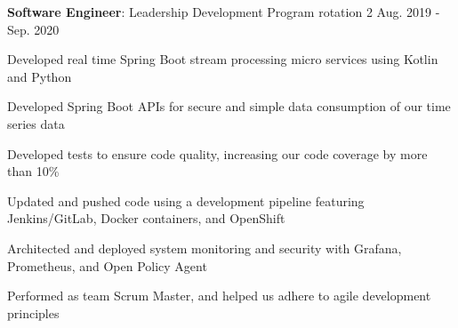 \begin{cventries}

\vspace{-1.25em}
\cventry
{\textbf{Software Engineer}: Leadership Development Program rotation 2} %
{} %
{} %
{Aug. 2019 - Sep. 2020} %
{ %
\begin{cvitems}
\item {Developed real time Spring Boot stream processing micro services using Kotlin and Python}
\item {Developed Spring Boot APIs for secure and simple data consumption of our time series data}
\item {Developed tests to ensure code quality, increasing our code coverage by more than 10\%}
\item {Updated and pushed code using a development pipeline featuring Jenkins/GitLab, Docker containers, and OpenShift}
\item {Architected and deployed system monitoring and security with Grafana, Prometheus, and Open Policy Agent}
\item {Performed as team Scrum Master, and helped us adhere to agile development principles}
\end{cvitems}
}




\end{cventries}
